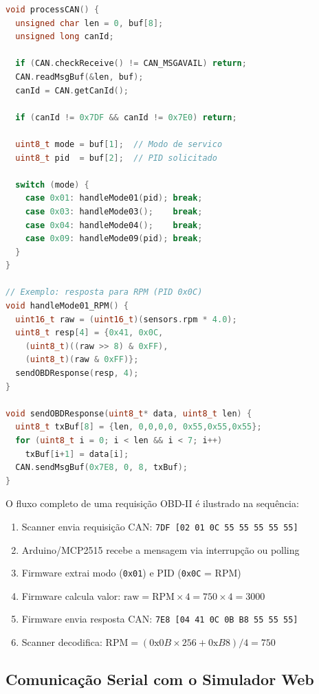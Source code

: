 \begin{lstlisting}[language=C++, caption={Processamento de requisição CAN e resposta OBD-II.}, label={lst:arduino-can}]
void processCAN() {
  unsigned char len = 0, buf[8];
  unsigned long canId;

  if (CAN.checkReceive() != CAN_MSGAVAIL) return;
  CAN.readMsgBuf(&len, buf);
  canId = CAN.getCanId();

  if (canId != 0x7DF && canId != 0x7E0) return;

  uint8_t mode = buf[1];  // Modo de servico
  uint8_t pid  = buf[2];  // PID solicitado

  switch (mode) {
    case 0x01: handleMode01(pid); break;
    case 0x03: handleMode03();    break;
    case 0x04: handleMode04();    break;
    case 0x09: handleMode09(pid); break;
  }
}

// Exemplo: resposta para RPM (PID 0x0C)
void handleMode01_RPM() {
  uint16_t raw = (uint16_t)(sensors.rpm * 4.0);
  uint8_t resp[4] = {0x41, 0x0C,
    (uint8_t)((raw >> 8) & 0xFF),
    (uint8_t)(raw & 0xFF)};
  sendOBDResponse(resp, 4);
}

void sendOBDResponse(uint8_t* data, uint8_t len) {
  uint8_t txBuf[8] = {len, 0,0,0,0, 0x55,0x55,0x55};
  for (uint8_t i = 0; i < len && i < 7; i++)
    txBuf[i+1] = data[i];
  CAN.sendMsgBuf(0x7E8, 0, 8, txBuf);
}
\end{lstlisting}

O fluxo completo de uma requisição OBD-II é ilustrado na sequência:

\begin{enumerate}
    \item Scanner envia requisição CAN: \texttt{7DF [02 01 0C 55 55 55 55 55]}
    \item Arduino/MCP2515 recebe a mensagem via interrupção ou polling
    \item Firmware extrai modo (\texttt{0x01}) e PID (\texttt{0x0C} = RPM)
    \item Firmware calcula valor: $\text{raw} = \text{RPM} \times 4 = 750 \times 4 = 3000$
    \item Firmware envia resposta CAN: \texttt{7E8 [04 41 0C 0B B8 55 55 55]}
    \item Scanner decodifica: $\text{RPM} = (0\text{x}0B \times 256 + 0\text{x}B8) / 4 = 750$
\end{enumerate}

\subsection{Comunicação Serial com o Simulador Web}

